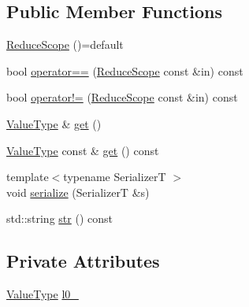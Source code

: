 \subsection*{Public Member Functions}
\begin{DoxyCompactItemize}
\item 
\hyperlink{structvt_1_1collective_1_1reduce_1_1detail_1_1_reduce_scope_ac1da975b48590fd29147a12ef1be3e56}{Reduce\+Scope} ()=default
\item 
bool \hyperlink{structvt_1_1collective_1_1reduce_1_1detail_1_1_reduce_scope_ae10b3887779309ee627921c794b0c4de}{operator==} (\hyperlink{structvt_1_1collective_1_1reduce_1_1detail_1_1_reduce_scope}{Reduce\+Scope} const \&in) const
\item 
bool \hyperlink{structvt_1_1collective_1_1reduce_1_1detail_1_1_reduce_scope_ac5023740d97cfbe4e617bc09e78a23d5}{operator!=} (\hyperlink{structvt_1_1collective_1_1reduce_1_1detail_1_1_reduce_scope}{Reduce\+Scope} const \&in) const
\item 
\hyperlink{structvt_1_1collective_1_1reduce_1_1detail_1_1_reduce_scope_aac14cd07e9678d96b761d90aa1ed3bb0}{Value\+Type} \& \hyperlink{structvt_1_1collective_1_1reduce_1_1detail_1_1_reduce_scope_aaceb69a568f8a644c99b4cdd0769abab}{get} ()
\item 
\hyperlink{structvt_1_1collective_1_1reduce_1_1detail_1_1_reduce_scope_aac14cd07e9678d96b761d90aa1ed3bb0}{Value\+Type} const  \& \hyperlink{structvt_1_1collective_1_1reduce_1_1detail_1_1_reduce_scope_a8eb7250d0fc83b45fa318f91bde27045}{get} () const
\item 
{\footnotesize template$<$typename SerializerT $>$ }\\void \hyperlink{structvt_1_1collective_1_1reduce_1_1detail_1_1_reduce_scope_a4b8b74530ce615997bec278690c12be8}{serialize} (SerializerT \&s)
\item 
std\+::string \hyperlink{structvt_1_1collective_1_1reduce_1_1detail_1_1_reduce_scope_a8fbbaff85c592424bedc8daf5fce7e02}{str} () const
\end{DoxyCompactItemize}
\subsection*{Private Attributes}
\begin{DoxyCompactItemize}
\item 
\hyperlink{structvt_1_1collective_1_1reduce_1_1detail_1_1_reduce_scope_aac14cd07e9678d96b761d90aa1ed3bb0}{Value\+Type} \hyperlink{structvt_1_1collective_1_1reduce_1_1detail_1_1_reduce_scope_ab0e1e9603e220a5ad22e2b664ddcf050}{l0\+\_\+}
\end{DoxyCompactItemize}
